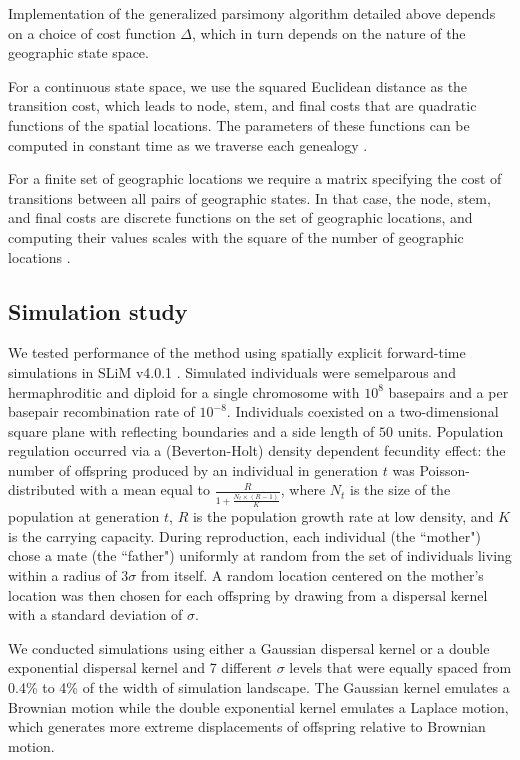 Implementation of the generalized parsimony algorithm detailed above depends on
a choice of cost function $\Delta$, which in turn depends on the nature of the
geographic state space.

For a continuous state space, we use the squared Euclidean distance as the 
transition cost, which leads to node, stem, and final costs that are quadratic 
functions of the spatial locations. The parameters of these functions can be 
computed in constant time as we traverse each genealogy \citep{Maddison_1991}.

For a finite set of geographic locations we require a matrix specifying the 
cost of transitions between all pairs of geographic states. In that case, the
node, stem, and final costs are discrete functions on the set of geographic
locations, and computing their values scales with the square of the number of
geographic locations \citep{Clemente_etal_2009}.

\subsection{Simulation study}

We tested performance of the method using spatially explicit forward-time 
simulations in SLiM v4.0.1 \citep{Haller_Messer_2023}. Simulated individuals
were semelparous and hermaphroditic and diploid for a single chromosome with 
$10^8$ basepairs and a per basepair recombination rate of $10^{-8}$. Individuals
coexisted on a two-dimensional square plane with reflecting boundaries and a 
side length of $50$ units. Population regulation occurred via a (Beverton-Holt) 
density dependent fecundity effect: the number of offspring produced by an 
individual in generation $t$ was Poisson-distributed with a mean equal to 
$\frac{R}{1 + \frac{N_t \times (R-1)}{K}}$, where $N_t$ is the size of the 
population at generation $t$, $R$ is the population growth rate at low density, 
and $K$ is the carrying capacity. During reproduction, each individual 
(the ``mother") chose a mate (the ``father") uniformly at random from the set 
of individuals living within a radius of $3\sigma$ from itself. A random 
location centered on the mother's location was then chosen for each offspring 
by drawing from a dispersal kernel with a standard deviation of $\sigma$.

We conducted simulations using either a Gaussian dispersal kernel or a double
exponential dispersal kernel and 7 different $\sigma$ levels that were equally
spaced from 0.4\% to 4\% of the width of simulation landscape. The Gaussian
kernel emulates a Brownian motion while the double exponential kernel emulates
a Laplace motion, which generates more extreme displacements of offspring
relative to Brownian motion.


